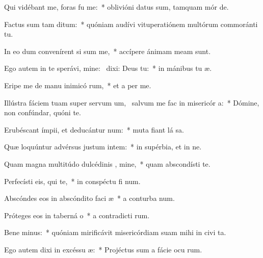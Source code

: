 \item Qui vidébant me, foras fu  me:~* oblivióni datus sum, tamquam mór  de.
\item Factus sum tam  ditum:~* quóniam audívi vituperatiónem multórum commoránti  tu.
\item In eo dum convenírent si sum me,~* accípere ánimam meam  sunt.
\item Ego autem in te sperávi, mine:~\pscross{} dixi: Deus   tu:~* in mánibus tu  æ.
\item Eripe me de manu inimicó rum,~* et a per me.
\item Illústra fáciem tuam super servum um,~\pscross{} salvum me fac in misericór a:~* Dómine, non confúndar, quóni  te.
\item Erubéscant ímpii, et deducántur  num:~* muta fiant lá sa.
\item Quæ loquúntur advérsus justum intem:~* in supérbia, et in ne.
\item Quam magna multitúdo dulcédinis , mine,~* quam abscondísti  te.
\item Perfecísti eis, qui   te,~* in conspéctu fi num.
\item Abscóndes eos in abscóndito faci æ~* a conturba num.
\item Próteges eos in taberná o~* a contradicti rum.
\item Bene minus:~* quóniam mirificávit misericórdiam suam mihi in civi ta.
\item Ego autem dixi in excéssu  æ:~* Projéctus sum a fácie ocu rum.
